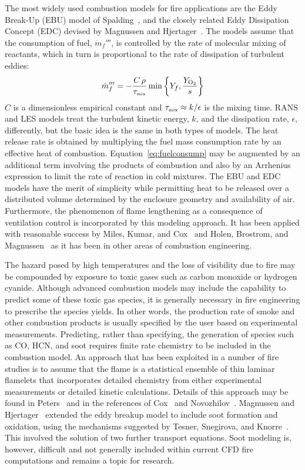 \documentclass[graybox]{svmult}
\begin{document}
The most widely used combustion models for fire applications are the Eddy Break-Up (EBU) model of Spalding~\cite{Spalding:1971}, and the closely related Eddy Dissipation Concept (EDC) devised by Magnussen and Hjertager~\cite{Magnussen}. The models assume that the consumption of fuel, $\dot{m}_f'''$, is controlled by the rate of molecular mixing of reactants, which in turn is proportional to the rate of dissipation of turbulent eddies:
\begin{equation}
\dot{m}_f''' = - \frac{C \, \rho}{\tau_{\hbox{\tiny mix}}} \min \left\{ Y_f, \frac{Y_{\mathrm{O_2}}}{s} \right\}
\label{eq:fuelconsump}
\end{equation}
$C$ is a dimensionless empirical constant and $\tau_{\hbox{\tiny mix}} \approx k/\epsilon$ is the mixing time. RANS and LES models treat the turbulent kinetic energy, $k$, and the dissipation rate, $\epsilon$, differently, but the basic idea is the same in both types of models. The heat release rate is obtained by multiplying the fuel mass consumption rate by an effective heat of combustion. Equation~\ref{eq:fuelconsump} may be augmented by an additional term involving the products of combustion and also by an Arrhenius expression to limit the rate of reaction in cold mixtures. The EBU and EDC models have the merit of simplicity while permitting heat to be released over a distributed volume determined by the enclosure geometry and availability of air. Furthermore, the phenomenon of flame lengthening as a consequence of ventilation control is incorporated by this modeling approach. It has been applied with reasonable success by Miles, Kumar, and Cox~\cite{Miles} and Holen, Brostrom, and Magnussen~\cite{Holen} as it has been in other areas of combustion engineering.

The hazard posed by high temperatures and the loss of visibility due to fire may be compounded by exposure to toxic gases such as carbon monoxide or hydrogen cyanide. Although advanced combustion models may include the capability to predict some of these toxic gas species, it is generally necessary in fire engineering to prescribe the species yields. In other words, the production rate of smoke and other combustion products is usually specified by the user based on experimental measurements. Predicting, rather than specifying, the generation of species such as CO, HCN, and soot requires finite rate chemistry to be included in the combustion model. An approach that has been exploited in a number of fire studies is to assume that the flame is a statistical ensemble of thin laminar flamelets that incorporates detailed chemistry from either experimental measurements or detailed kinetic calculations. Details of this approach may be found in Peters~\cite{Peters} and in the references of Cox~\cite{Cox:1998} and Novozhilov~\cite{Novozhilov}. Magnussen and Hjertager~\cite{Magnussen} extended the eddy breakup model to include soot formation and oxidation, using the mechanisms suggested by Tesner, Snegirova, and Knorre~\cite{Tesner}. This involved the solution of two further transport equations. Soot modeling is, however, difficult and not generally included within current CFD fire computations and remains a topic for research.
\end{document}
